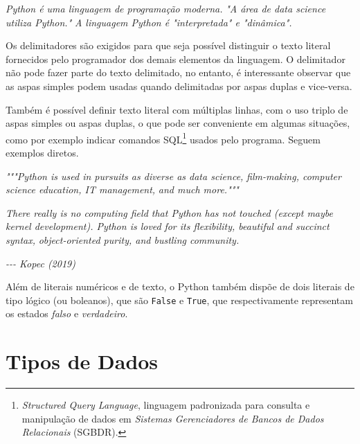 \documentclass[
]{book}
\newenvironment{Shaded}{\begin{snugshade}}{\end{snugshade}}
\newcommand{\CommentTok}[1]{\textcolor[rgb]{0.56,0.35,0.01}{\textit{#1}}}
\begin{document}
\begin{Shaded}
\begin{Highlighting}[]
\CommentTok{\textquotesingle{}Python é uma linguagem de programação moderna.\textquotesingle{}}
\CommentTok{"A área de \textquotesingle{}data science\textquotesingle{} utiliza Python."}
\CommentTok{\textquotesingle{}A linguagem Python é "interpretada" e "dinâmica".\textquotesingle{}}
\end{Highlighting}
\end{Shaded}

Os delimitadores são exigidos para que seja possível distinguir o texto literal fornecidos pelo programador dos demais elementos da linguagem. O delimitador não pode fazer parte do texto delimitado, no entanto, é interessante observar que as aspas simples podem usadas quando delimitadas por aspas duplas e vice-versa.

Também é possível definir texto literal com múltiplas linhas, com o uso triplo de aspas simples ou aspas duplas, o que pode ser conveniente em algumas situações, como por exemplo indicar comandos SQL\footnote{\emph{Structured Query Language}, linguagem padronizada para consulta e manipulação de dados em \emph{Sistemas Gerenciadores de Bancos de Dados Relacionais} (SGBDR).} usados pelo programa. Seguem exemplos diretos.

\begin{Shaded}
\begin{Highlighting}[]
\CommentTok{"""Python is used in pursuits as diverse as data science,}
\CommentTok{film{-}making, computer science education, IT management, }
\CommentTok{and much more."""}

\CommentTok{\textquotesingle{}\textquotesingle{}\textquotesingle{}There really is no computing field that Python has not }
\CommentTok{touched (except maybe kernel development). Python is loved}
\CommentTok{for its flexibility, beautiful and succinct syntax, }
\CommentTok{object{-}oriented purity, and bustling community.}

\CommentTok{{-}{-}{-} Kopec (2019)\textquotesingle{}\textquotesingle{}\textquotesingle{}}
\end{Highlighting}
\end{Shaded}

Além de literais numéricos e de texto, o Python também dispõe de dois literais de tipo lógico (ou boleanos), que são \texttt{False} e \texttt{True}, que respectivamente representam os estados \emph{falso} e \emph{verdadeiro}.

\hypertarget{comput-tipos}{%
\section{Tipos de Dados}\label{comput-tipos}}
\end{document}
